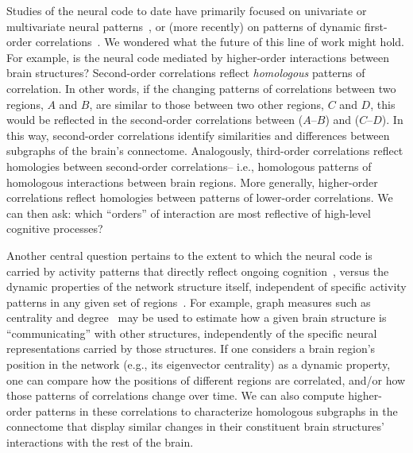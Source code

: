 \documentclass[english]{article}
\begin{document}
Studies of the neural code to date have primarily focused on
univariate or multivariate neural patterns~\citep[for review
see][]{NormEtal06}, or (more recently) on patterns of dynamic
first-order correlations~\citep[i.e., interactions between pairs of
brain structures;][]{MannEtal18, FongEtal19}.  We wondered what the
future of this line of work might hold.  For example, is the neural
code mediated by higher-order interactions between brain structures?
Second-order correlations reflect \textit{homologous} patterns of
correlation.  In other words, if the changing patterns of correlations
between two regions, $A$ and $B$, are similar to those between two
other regions, $C$ and $D$, this would be reflected in the
second-order correlations between ($A$--$B$) and ($C$--$D$).  In this
way, second-order correlations identify similarities and differences
between subgraphs of the brain's connectome.  Analogously, third-order
correlations reflect homologies between second-order correlations--
i.e., homologous patterns of homologous interactions between brain
regions.  More generally, higher-order correlations reflect homologies
between patterns of lower-order correlations.  We can then ask: which
``orders'' of interaction are most reflective of high-level cognitive
processes?

Another central question pertains to the extent to which the neural
code is carried by activity patterns that directly reflect ongoing
cognition~\citep[e.g., following][]{HaxbEtal01, NormEtal06}, versus
the dynamic properties of the network structure itself, independent of
specific activity patterns in any given set of regions~\citep[e.g.,
following][]{BassEtal06}.  For example, graph measures such as
centrality and degree~\citep{BullSpor09} may be used to estimate how a
given brain structure is ``communicating'' with other structures,
independently of the specific neural representations carried by those
structures.  If one considers a brain region's position in the network
(e.g., its eigenvector centrality) as a dynamic property, one can
compare how the positions of different regions are correlated, and/or
how those patterns of correlations change over time.  We can also
compute higher-order patterns in these correlations to characterize
homologous subgraphs in the connectome that display similar changes in
their constituent brain structures' interactions with the rest of the
brain.
\end{document}
